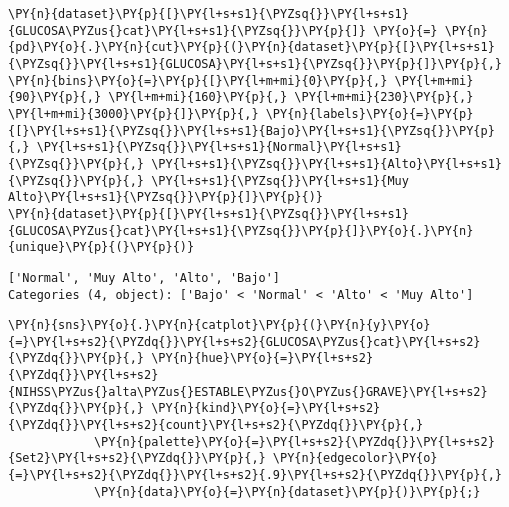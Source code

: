     \begin{tcolorbox}[breakable, size=fbox, boxrule=1pt, pad at break*=1mm,colback=cellbackground, colframe=cellborder]
\begin{Verbatim}[commandchars=\\\{\}]
\PY{n}{dataset}\PY{p}{[}\PY{l+s+s1}{\PYZsq{}}\PY{l+s+s1}{GLUCOSA\PYZus{}cat}\PY{l+s+s1}{\PYZsq{}}\PY{p}{]} \PY{o}{=} \PY{n}{pd}\PY{o}{.}\PY{n}{cut}\PY{p}{(}\PY{n}{dataset}\PY{p}{[}\PY{l+s+s1}{\PYZsq{}}\PY{l+s+s1}{GLUCOSA}\PY{l+s+s1}{\PYZsq{}}\PY{p}{]}\PY{p}{,} \PY{n}{bins}\PY{o}{=}\PY{p}{[}\PY{l+m+mi}{0}\PY{p}{,} \PY{l+m+mi}{90}\PY{p}{,} \PY{l+m+mi}{160}\PY{p}{,} \PY{l+m+mi}{230}\PY{p}{,} \PY{l+m+mi}{3000}\PY{p}{]}\PY{p}{,} \PY{n}{labels}\PY{o}{=}\PY{p}{[}\PY{l+s+s1}{\PYZsq{}}\PY{l+s+s1}{Bajo}\PY{l+s+s1}{\PYZsq{}}\PY{p}{,} \PY{l+s+s1}{\PYZsq{}}\PY{l+s+s1}{Normal}\PY{l+s+s1}{\PYZsq{}}\PY{p}{,} \PY{l+s+s1}{\PYZsq{}}\PY{l+s+s1}{Alto}\PY{l+s+s1}{\PYZsq{}}\PY{p}{,} \PY{l+s+s1}{\PYZsq{}}\PY{l+s+s1}{Muy Alto}\PY{l+s+s1}{\PYZsq{}}\PY{p}{]}\PY{p}{)}
\PY{n}{dataset}\PY{p}{[}\PY{l+s+s1}{\PYZsq{}}\PY{l+s+s1}{GLUCOSA\PYZus{}cat}\PY{l+s+s1}{\PYZsq{}}\PY{p}{]}\PY{o}{.}\PY{n}{unique}\PY{p}{(}\PY{p}{)}
\end{Verbatim}
\end{tcolorbox}

            \begin{tcolorbox}[breakable, size=fbox, boxrule=.5pt, pad at break*=1mm, opacityfill=0]
\begin{Verbatim}[commandchars=\\\{\}]
['Normal', 'Muy Alto', 'Alto', 'Bajo']
Categories (4, object): ['Bajo' < 'Normal' < 'Alto' < 'Muy Alto']
\end{Verbatim}
\end{tcolorbox}
        
    \begin{tcolorbox}[breakable, size=fbox, boxrule=1pt, pad at break*=1mm,colback=cellbackground, colframe=cellborder]
\begin{Verbatim}[commandchars=\\\{\}]
\PY{n}{sns}\PY{o}{.}\PY{n}{catplot}\PY{p}{(}\PY{n}{y}\PY{o}{=}\PY{l+s+s2}{\PYZdq{}}\PY{l+s+s2}{GLUCOSA\PYZus{}cat}\PY{l+s+s2}{\PYZdq{}}\PY{p}{,} \PY{n}{hue}\PY{o}{=}\PY{l+s+s2}{\PYZdq{}}\PY{l+s+s2}{NIHSS\PYZus{}alta\PYZus{}ESTABLE\PYZus{}O\PYZus{}GRAVE}\PY{l+s+s2}{\PYZdq{}}\PY{p}{,} \PY{n}{kind}\PY{o}{=}\PY{l+s+s2}{\PYZdq{}}\PY{l+s+s2}{count}\PY{l+s+s2}{\PYZdq{}}\PY{p}{,}
            \PY{n}{palette}\PY{o}{=}\PY{l+s+s2}{\PYZdq{}}\PY{l+s+s2}{Set2}\PY{l+s+s2}{\PYZdq{}}\PY{p}{,} \PY{n}{edgecolor}\PY{o}{=}\PY{l+s+s2}{\PYZdq{}}\PY{l+s+s2}{.9}\PY{l+s+s2}{\PYZdq{}}\PY{p}{,}
            \PY{n}{data}\PY{o}{=}\PY{n}{dataset}\PY{p}{)}\PY{p}{;}
\end{Verbatim}
\end{tcolorbox}

